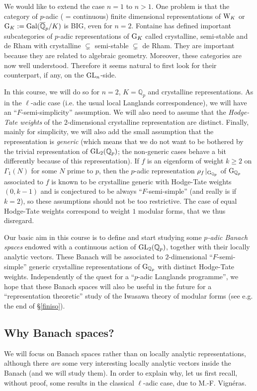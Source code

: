 \documentclass[11pt]{amsart}
\def\Q{{\mathbb Q}_p}
\def\g{{\rm G}_{\Q}}
\def\G{{\rm GL}_2(\Q)}
\begin{document}
We would like to extend the case $n=1$ to $n>1$. One problem is that
the category of $p$-adic ( = continuous) finite dimensional
representations of ${\rm W}_K$ or ${\rm G}_K:={\rm
  Gal}(\overline\Q/K)$ is BIG, even for $n=2$. Fontaine has defined
important subcategories of $p$-adic representations of ${\rm G}_K$
called crystalline, semi-stable and de Rham with crystalline
$\subsetneq$ semi-stable $\subsetneq$ de Rham. They are important
because they are related to algebraic geometry. Moreover, these
categories are now well understood. Therefore it seems natural to
first look for their counterpart, if any, on the ${\rm GL}_n$-side.
  
In this course, we will do so for $n=2$, $K=\Q$ and crystalline
representations. As in the $\ell$-adic case (i.e. the usual local
Langlands correspondence), we will have an ``$F$-semi-simplicity''
assumption. We will also need to assume that the {\it Hodge-Tate
  weights} of the $2$-dimensional crystalline representation are
distinct. Finally, mainly for simplicity, we will also add the small
assumption that the representation is {\it generic} (which means that
we do not want to be bothered by the trivial representation of $\G$;
the non-generic cases behave a bit differently because of this
representation). If $f$ is an eigenform of weight $k\geq 2$ on
$\Gamma_1(N)$ for some $N$ prime to $p$, then the $p$-adic
representation $\rho_f\!\mid_{\g}$ of $\g$ associated to $f$ is known
to be crystalline generic with Hodge-Tate weights $(0,k-1)$ and is
conjectured to be always ``$F$-semi-simple'' (and really is if $k=2$),
so these assumptions should not be too restrictive. The case of equal
Hodge-Tate weights correspond to weight $1$ modular forms, that we
thus disregard.

Our basic aim in this course is to define and start studying some {\it
$p$-adic Banach spaces} endowed with a continuous action of $\G$,
together with their locally analytic vectors. These Banach will be
associated to $2$-dimensional ``$F$-semi-simple'' generic crystalline
representations of $\g$ with distinct Hodge-Tate
weights. Independently of the quest for a ``$p$-adic Langlands
programme'', we hope that these Banach spaces will also be useful in
the future for a ``representation theoretic'' study of the Iwasawa
theory of modular forms (see e.g. the end of \S\ref{finiso}). 

 
\subsection{Why Banach spaces?} 
We will focus on Banach spaces rather than on locally analytic
representations, although there {\it are} some very interesting
locally analytic vectors inside the Banach (and we will study
them). In order to explain why, let us first recall, without proof,
some results in the classical $\ell$-adic case, due to
M.-F. Vign\'eras.
\end{document}
